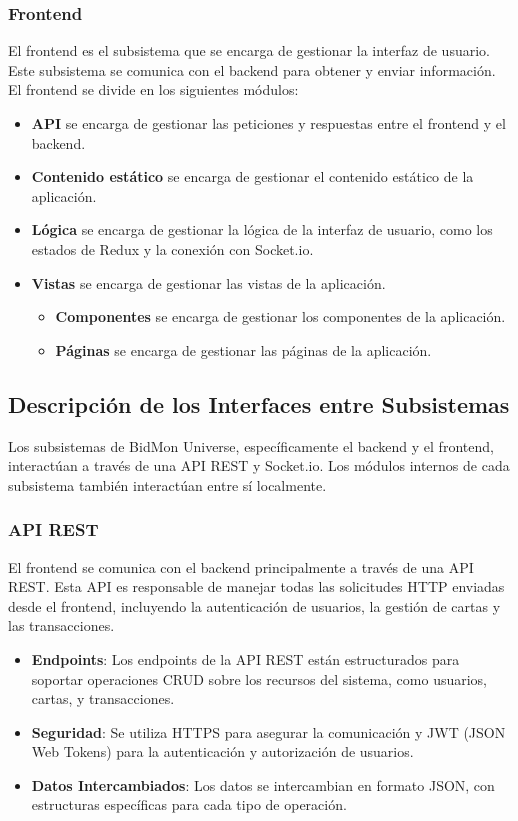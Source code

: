 \subsubsection{Frontend}
El frontend es el subsistema que se encarga de gestionar la interfaz de usuario.
Este subsistema se comunica con el backend para obtener y enviar información.
El frontend se divide en los siguientes módulos:
\begin{itemize}
    \item \textbf{API} se encarga de gestionar las peticiones y respuestas entre el frontend y el backend.
    \item \textbf{Contenido estático} se encarga de gestionar el contenido estático de la aplicación.
    \item \textbf{Lógica} se encarga de gestionar la lógica de la interfaz de usuario, como los estados de Redux y la conexión con Socket.io.
    \item \textbf{Vistas} se encarga de gestionar las vistas de la aplicación.
    \begin{itemize}
        \item \textbf{Componentes} se encarga de gestionar los componentes de la aplicación.
        \item \textbf{Páginas} se encarga de gestionar las páginas de la aplicación.
    \end{itemize}
\end{itemize}

\subsection{Descripción de los Interfaces entre Subsistemas}
Los subsistemas de BidMon Universe, específicamente el backend y el frontend, interactúan a través de una API REST y Socket.io.
Los módulos internos de cada subsistema también interactúan entre sí localmente.

\subsubsection{API REST}
El frontend se comunica con el backend principalmente a través de una API REST. Esta API es responsable de manejar todas las solicitudes HTTP enviadas desde el frontend, incluyendo la autenticación de usuarios, la gestión de cartas y las transacciones.

\begin{itemize}
    \item \textbf{Endpoints}: Los endpoints de la API REST están estructurados para soportar operaciones CRUD sobre los recursos del sistema, como usuarios, cartas, y transacciones.
    \item \textbf{Seguridad}: Se utiliza HTTPS para asegurar la comunicación y JWT (JSON Web Tokens) para la autenticación y autorización de usuarios.
    \item \textbf{Datos Intercambiados}: Los datos se intercambian en formato JSON, con estructuras específicas para cada tipo de operación. 
\end{itemize}

